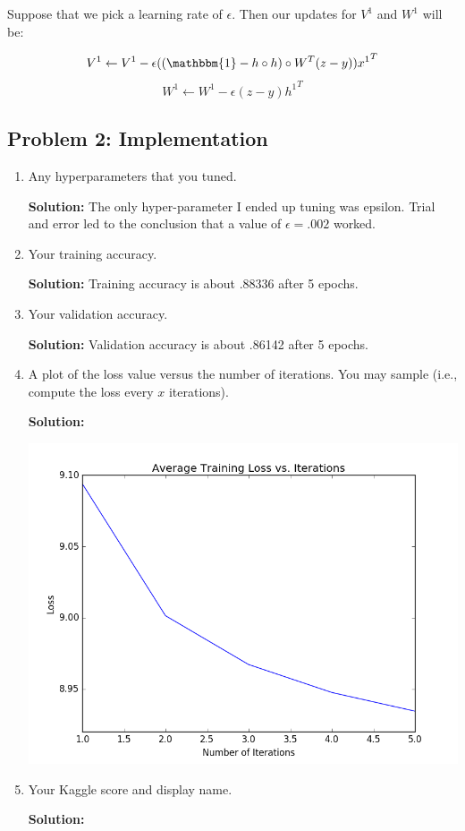 \documentclass{article}
\newcommand{\solution}{\textbf{Solution: }}
\begin{document}
Suppose that we pick a learning rate of $\epsilon$. Then our updates for $V^1$ and $W^1$ will be:

$$V^1 \leftarrow V^1 - \epsilon((\mathbbm{1}-h \circ h) \circ W^T(z-y)){x^1}^T$$
$$W^1 \leftarrow W^1 - \epsilon(z-y){h^1}^T$$

\newpage
\subsection*{Problem 2: Implementation}    
\begin{enumerate}
    \item Any hyperparameters that you tuned.
    \begin{mdframed}
    \solution The only hyper-parameter I ended up tuning was epsilon. Trial and error led to the conclusion that a value of $\epsilon = .002$ worked.
    \end{mdframed}
        
    \item Your training accuracy.
    \begin{mdframed}
    \solution Training accuracy is about .88336 after 5 epochs.
    \end{mdframed}
        
    \item Your validation accuracy.
    \begin{mdframed}
    \solution Validation accuracy is about .86142 after 5 epochs.
    \end{mdframed}
        
    \item A plot of the loss value versus the number of iterations. You may sample (i.e., compute the loss every $x$ iterations).
    \begin{mdframed}
    \solution
    
    \includegraphics[scale=.6]{loss.png}\\
    \end{mdframed}
    \item Your Kaggle score and display name.
    \begin{mdframed}
    \solution
    

\end{mdframed}
\end{enumerate}
\end{document}
